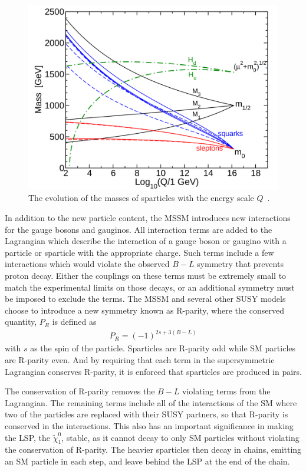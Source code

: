 \begin{figure}
\centering
\includegraphics[width=\fullfig]{figures/susy_masses.png}
\caption{The evolution of the masses of sparticles with the energy scale $Q$~\cite{susy_primer}.}
\label{fig:susy_masses}
\end{figure}

In addition to the new particle content, the \ac{MSSM} introduces new interactions for the gauge bosons and gauginos.
All interaction terms are added to the Lagrangian which describe the interaction of a gauge boson or gaugino with a particle or sparticle with the appropriate charge.
Such terms include a few interactions which would violate the observed $B - L$ symmetry that prevents proton decay.
Either the couplings on these terms must be extremely small to match the experimental limits on those decays, or an additional symmetry must be imposed to exclude the terms.
The \ac{MSSM} and several other \ac{SUSY} models choose to introduce a new symmetry known as R-parity, where the conserved quantity, $P_R$ is defined as
\begin{align*}
P_R = (-1)^{2s + 3(B-L)}
\end{align*}
with $s$ as the spin of the particle.
Sparticles are R-parity odd while \ac{SM} particles are R-parity even.
And by requiring that each term in the supersymmetric Lagrangian conserves R-parity, it is enforced that sparticles are produced in pairs.

The conservation of R-parity removes the $B-L$ violating terms from the Lagrangian.
The remaining terms include all of the interactions of the \ac{SM} where two of the particles are replaced with their \ac{SUSY} partners, so that R-parity is conserved in the interactions.
This also has an important significance in making the \acf{LSP}, the $\tilde{\chi}_1^0$, stable, as it cannot decay to only \ac{SM} particles without violating the conservation of R-parity.
The heavier sparticles then decay in chains, emitting an \ac{SM} particle in each step, and leave behind the \ac{LSP} at the end of the chain.

